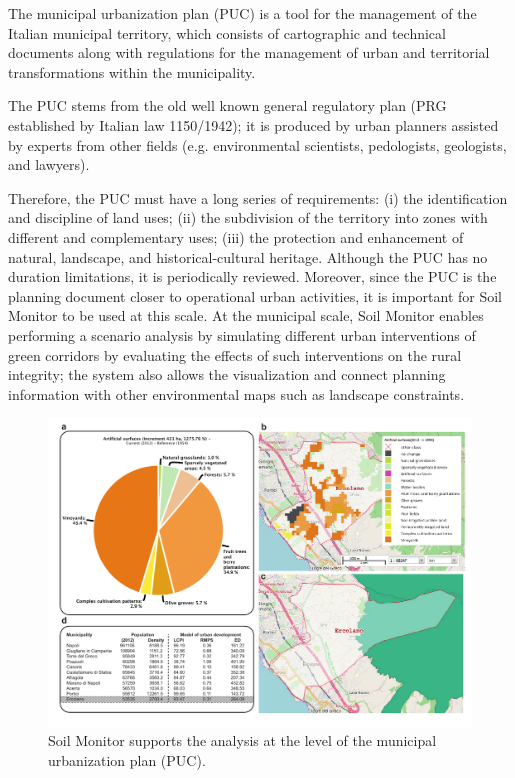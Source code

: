 \documentclass[APA,LATO1COL,doublespace]{WileyNJD-v2}
\begin{document}
The municipal urbanization plan (PUC) is a tool for the management of the Italian municipal territory, which consists of cartographic and technical documents along with regulations for the management of urban and territorial transformations within the municipality.

The PUC stems from the old well known general regulatory plan (PRG established by Italian law 1150/1942); it is produced by urban planners assisted by experts from other fields (e.g. environmental scientists, pedologists, geologists, and lawyers).

Therefore, the PUC must have a long series of requirements: (i) the identification and discipline of land uses; (ii) the subdivision of the territory into zones with different and complementary uses; (iii) the protection and enhancement of natural, landscape, and historical-cultural heritage. 
Although the PUC has no duration limitations, it is periodically reviewed.
Moreover, since the PUC is the planning document closer to operational urban activities, it is important for Soil Monitor to be used at this scale. 
At the municipal scale, Soil Monitor enables performing a scenario analysis by simulating different urban interventions of green corridors by evaluating the effects of such interventions on the rural integrity; the system also allows the visualization and connect planning information with other environmental maps such as landscape constraints.

\begin{figure}[t] %
    \centerline{\includegraphics[width=450pt]{daMileti/07_caso_comunale.pdf}}
    \caption{ Soil Monitor supports the analysis at the level of the municipal urbanization plan (PUC). } \label{fig:caseCOM}
\end{figure}
\end{document}
